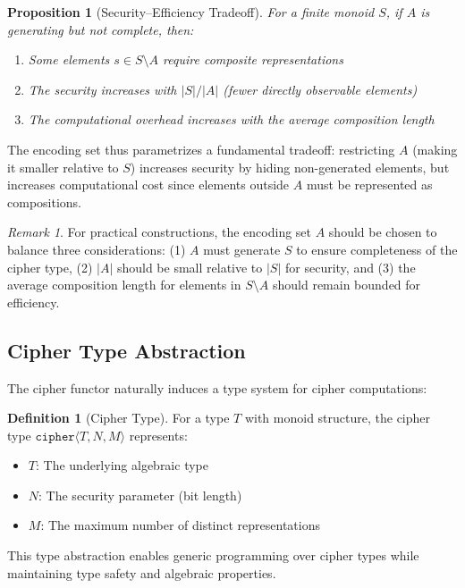 \documentclass[11pt]{article}
\theoremstyle{definition}
\newtheorem{definition}{Definition}[section]
\theoremstyle{plain}
\newtheorem{proposition}[theorem]{Proposition}
\theoremstyle{remark}
\newtheorem{remark}{Remark}[section]
\begin{document}
\begin{proposition}[Security--Efficiency Tradeoff]
\label{prop:encoding-tradeoff}
For a finite monoid $S$, if $A$ is generating but not complete, then:
\begin{enumerate}
\item Some elements $s \in S \setminus A$ require composite representations
\item The security increases with $|S|/|A|$ (fewer directly observable elements)
\item The computational overhead increases with the average composition length
\end{enumerate}
\end{proposition}

The encoding set thus parametrizes a fundamental tradeoff: restricting $A$ (making it smaller relative to $S$) increases security by hiding non-generated elements, but increases computational cost since elements outside $A$ must be represented as compositions.

\begin{remark}
For practical constructions, the encoding set $A$ should be chosen to balance three considerations: (1) $A$ must generate $S$ to ensure completeness of the cipher type, (2) $|A|$ should be small relative to $|S|$ for security, and (3) the average composition length for elements in $S \setminus A$ should remain bounded for efficiency.
\end{remark}

\subsection{Cipher Type Abstraction}

The cipher functor naturally induces a type system for cipher computations:

\begin{definition}[Cipher Type]
\label{def:cipher-type}
For a type $T$ with monoid structure, the cipher type $\texttt{cipher}\langle T,N,M \rangle$ represents:
\begin{itemize}
\item $T$: The underlying algebraic type
\item $N$: The security parameter (bit length)
\item $M$: The maximum number of distinct representations
\end{itemize}
\end{definition}

This type abstraction enables generic programming over cipher types while maintaining type safety and algebraic properties.
\end{document}
